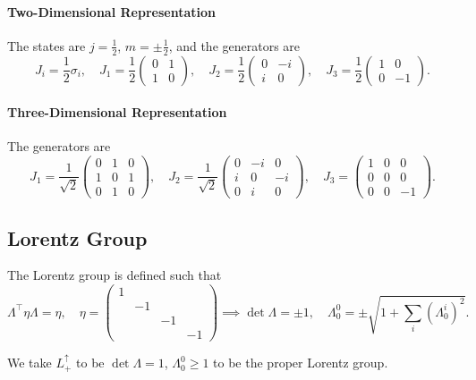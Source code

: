 \documentclass{article}
\begin{document}
\paragraph{Two-Dimensional Representation}
The states are $j=\frac 12$, $m=\pm\frac 12$, and the generators are 
$$J_i=\frac 12\sigma_i,\quad J_1=\frac 12\begin{pmatrix}0&1\\1&0\end{pmatrix},\quad J_2=\frac 12\begin{pmatrix}0&-i\\i&0\end{pmatrix},\quad J_3=\frac 12\begin{pmatrix}1&0\\0&-1\end{pmatrix}.$$
\paragraph{Three-Dimensional Representation}
The generators are 
$$J_1=\frac 1{\sqrt 2}\begin{pmatrix}0&1&0\\1&0&1\\0&1&0\end{pmatrix},\quad J_2=\frac 1{\sqrt 2}\begin{pmatrix}0&-i&0\\i&0&-i\\0&i&0\end{pmatrix},\quad J_3=\begin{pmatrix}1&0&0\\0&0&0\\0&0&-1\end{pmatrix}.$$

\subsection{Lorentz Group}
The Lorentz group is defined such that 
$$\Lambda^\intercal\eta\Lambda=\eta,\quad \eta=\begin{pmatrix}1&&&\\&-1&&\\&&-1&\\&&&-1\end{pmatrix}\implies\det\Lambda=\pm 1,\quad\Lambda^0_0=\pm\sqrt{1+\sum_i(\Lambda^i_0)^2}.$$

We take $L^\uparrow_+$ to be $\det\Lambda=1$, $\Lambda^0_0\ge 1$ to be the proper Lorentz group.
\end{document}
